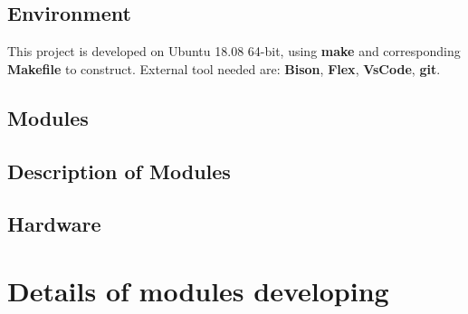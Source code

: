 \documentclass{article}
\begin{document}
		\subsection{Environment}
		This project is developed on Ubuntu 18.08 64-bit, using \textbf{make} and corresponding \textbf{Makefile} to construct. External tool needed are: \textbf{Bison}, \textbf{Flex}, \textbf{VsCode}, \textbf{git}.
		\subsection{Modules}
		\subsection{Description of Modules}
		\subsection{Hardware}
		
		\section{Details of modules developing}
		
	
\end{document}
